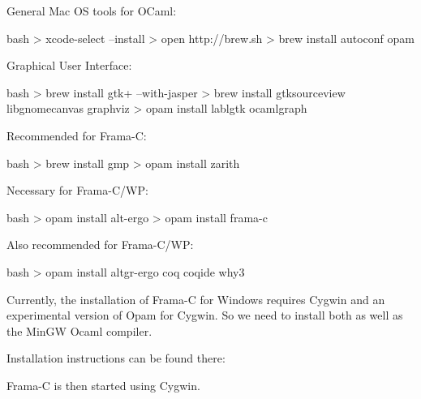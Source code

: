 \documentclass[middle]{zmdocument}
\begin{document}
General Mac OS tools for OCaml:



\begin{CodeBlock}{bash}
> xcode-select --install 
> open http://brew.sh
> brew install autoconf opam 
\end{CodeBlock}



Graphical User Interface:



\begin{CodeBlock}{bash}
> brew install gtk+ --with-jasper
> brew install gtksourceview libgnomecanvas graphviz
> opam install lablgtk ocamlgraph 
\end{CodeBlock}



Recommended for Frama-C:



\begin{CodeBlock}{bash}
> brew install gmp
> opam install zarith
\end{CodeBlock}



Necessary for Frama-C/WP:



\begin{CodeBlock}{bash}
> opam install alt-ergo
> opam install frama-c
\end{CodeBlock}



Also recommended for Frama-C/WP:



\begin{CodeBlock}{bash}
> opam install altgr-ergo coq coqide why3
\end{CodeBlock}



Currently, the installation of Frama-C for Windows requires Cygwin and
an experimental version of Opam for Cygwin. So we need to install both
as well as the MinGW Ocaml compiler.



Installation instructions can be found there:






Frama-C is then started using Cygwin.
\end{document}
